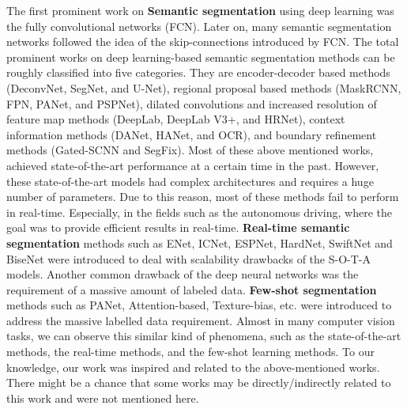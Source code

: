 \documentclass{article}
\begin{document}
The first prominent work on \textbf{Semantic segmentation} using deep learning was the fully convolutional networks (FCN)\cite{long2015fully}. Later on, many semantic segmentation networks followed the idea of the skip-connections introduced by FCN. The total prominent works on deep learning-based semantic segmentation methods can be roughly classified into five categories.  They are encoder-decoder based methods (DeconvNet\cite{noh2015learning}, SegNet\cite{badrinarayanan2017segnet}, and U-Net\cite{ronneberger2015u}), regional proposal based methods (MaskRCNN\cite{he2017mask}, FPN\cite{lin2017feature}, PANet\cite{liu2018path}, and PSPNet\cite{zhao2017pyramid}), dilated convolutions and increased resolution of feature map methods (DeepLab\cite{chen2017deeplab}, DeepLab V3+\cite{chen2018encoder}, and HRNet\cite{SunXLW19}), context information methods (DANet\cite{fu2019dual}, HANet\cite{choi2020cars}, and OCR\cite{10.1007/978-3-030-58539-6_11}), and boundary refinement methods (Gated-SCNN\cite{takikawa2019gated} and SegFix\cite{yuan2020segfix}). Most of these above mentioned works, achieved state-of-the-art performance at a certain time in the past. However, these state-of-the-art models had complex architectures and requires a huge number of parameters. Due to this reason, most of these methods fail to perform in real-time. Especially, in the fields such as the autonomous driving, where the goal was to provide efficient results in real-time. \newline
\textbf{Real-time semantic segmentation} methods such as  ENet\cite{paszke2016enet}, ICNet\cite{zhao2017pyramid}, ESPNet\cite{mehta2018espnet}, HardNet\cite{chao2019hardnet}, SwiftNet\cite{orsic2019defense} and BiseNet\cite{yu2018bisenet} were introduced to deal with scalability drawbacks of the S-O-T-A models. 
Another common drawback of the deep neural networks was the requirement of a massive amount of labeled data.\newline
\textbf{Few-shot segmentation} methods such as PANet\cite{wang2019panet}, Attention-based\cite{hu2019attention}, Texture-bias\cite{azad2020texture}, etc. were introduced to address the massive labelled data requirement.
Almost in many computer vision tasks, we can observe this similar kind of phenomena, such as the state-of-the-art methods, the real-time methods, and the few-shot learning methods.\newline
To our knowledge,  our work was inspired and related to the above-mentioned works. There might be a chance that some works may be directly/indirectly related to this work and were not mentioned here.
\end{document}
